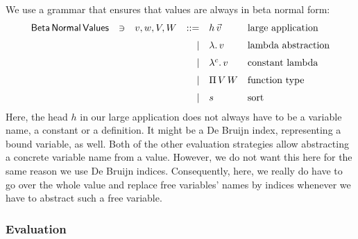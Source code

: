 \documentclass[12pt, a4paper, titlepage]{article}
\newcommand{\sspace}{\,}
\newcommand{\la}{\lambda}
\newcommand{\emphSec}[1]{#1}
\newcommand{\LaH}[1]{\la . \sspace #1}
\newcommand{\KH}[1]{\la^c . \sspace #1}
\newcommand{\PiH}[2]{\Pi \sspace #1 \sspace #2}
\newcommand{\LaVH}[1]{\LaH #1} %
\newcommand{\KVH}[1]{\KH #1} %
\newcommand{\FunH}[2]{\PiH #1 #2}
\begin{document}
We use a grammar that ensures that values are always in beta normal form:
\[
\begin{array}{lllrll}
\mathsf{Beta \, Normal \, Values}      & \ni & v,w,V,W & ::= & h \sspace \vec v & \mbox{large application} \\ 
\noalign{\medskip}
			                   &&& \mid & \LaVH v & \mbox{lambda abstraction} \\
\noalign{\medskip}
			                   &&& \mid & \KVH v & \mbox{constant lambda} \\ 
\noalign{\medskip}
			                   &&& \mid & \FunH V W & \mbox{function type} \\
\noalign{\medskip}
			                   &&& \mid & s & \mbox{sort}
\end{array}
\]
Here, the \emphSec{head} $h$ in our \emphSec{large application} does not always have to be a variable name, a constant or a definition. It might be a De Bruijn index, representing a bound variable, as well. Both of the other evaluation strategies allow abstracting a concrete variable name from a value. However, we do not want this here for the same reason we use De Bruijn indices. Consequently, here, we really do have to go over the whole value and replace free variables' names by indices whenever we have to abstract such a free variable. 


\subsubsection{Evaluation}
\end{document}
